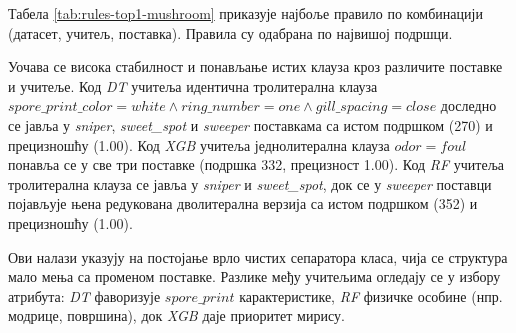 Табела \ref{tab:rules-top1-mushroom} приказује најбоље правило по комбинацији (датасет, учитељ, поставка). Правила су одабрана по највишој подршци.

\begin{table}[H]
\centering
{}
\caption{Најбоље правило за скуп \textit{mushroom} по комбинацији (учитељ, поставка), бирано по највишој подршци.}
\label{tab:rules-top1-mushroom}
\end{table}

Уочава се висока стабилност и понављање истих клауза кроз различите поставке и учитеље. Код \textit{DT} учитеља идентична тролитерална клауза $spore\_print\_color = white \land ring\_number = one \land gill\_spacing = close$ доследно се јавља у \textit{sniper}, \textit{sweet\_spot} и \textit{sweeper} поставкама са истом подршком (270) и прецизношћу (1.00). Код \textit{XGB} учитеља једнолитерална клауза $odor = foul$ понавља се у све три поставке (подршка 332, прецизност 1.00). Код \textit{RF} учитеља тролитерална клауза се јавља у \textit{sniper} и \textit{sweet\_spot}, док се у \textit{sweeper} поставци појављује њена редукована дволитерална верзија са истом подршком (352) и прецизношћу (1.00).

Ови налази указују на постојање врло чистих сепаратора класа, чија се структура мало мења са променом поставке. Разлике међу учитељима огледају се у избору атрибута: \textit{DT} фаворизује $spore\_print$ карактеристике, \textit{RF} физичке особине (нпр. модрице, површина), док \textit{XGB} даје приоритет мирису.

